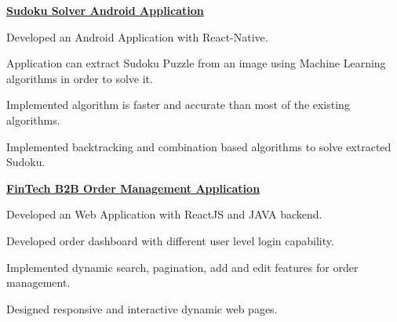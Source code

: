 \vspace{1.5mm}

\begin{cventries}

  \cventry
    {\large \textbf {\href{https://github.com/snehsagarajput/sudoku-solver-app}{Sudoku Solver Android Application}}} %
    {} %
    {} %
    {} %
    {\vspace{-1.5mm}
      \begin{cvitems} %
        \item {Developed an Android Application with React-Native.}
        \item{Application can extract Sudoku Puzzle from an image using Machine Learning algorithms in order to solve it.}
        \item {Implemented algorithm is faster and accurate than most of the existing algorithms.}
        \item {Implemented backtracking and combination based algorithms to solve extracted Sudoku.}
      \end{cvitems}
   \vspace{1.5mm} }

\end{cventries}

\begin{cventries}

  \cventry
    {\large \textbf {\href{https://github.com/snehsagarajput/fintech-order-management-webapp}{FinTech B2B Order Management Application}}} %
    {} %
    {} %
    {} %
    {\vspace{-1.5mm}
      \begin{cvitems} %
        \item {Developed an Web Application with ReactJS and JAVA backend.}
        \item{Developed order dashboard with different user level login capability.}
        \item {Implemented dynamic search, pagination, add and edit features for order management.}
        \item {Designed responsive and interactive dynamic web pages.}
      \end{cvitems}
  \vspace{1.5mm} }

\end{cventries}

